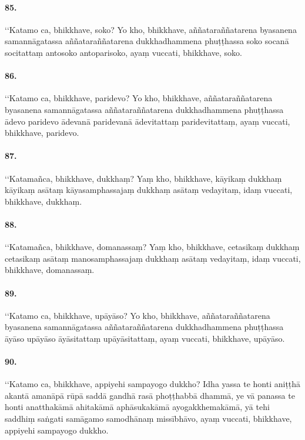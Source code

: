 \paragraph{85.} ‘‘Katamo ca, bhikkhave, soko? Yo kho, bhikkhave, aññataraññatarena byasanena samannāgatassa aññataraññatarena dukkhadhammena phuṭṭhassa soko socanā socitattaṃ antosoko antoparisoko, ayaṃ vuccati, bhikkhave, soko.

\paragraph{86.} ‘‘Katamo ca, bhikkhave, paridevo? Yo kho, bhikkhave, aññataraññatarena byasanena samannāgatassa aññataraññatarena dukkhadhammena phuṭṭhassa ādevo paridevo ādevanā paridevanā ādevitattaṃ paridevitattaṃ, ayaṃ vuccati, bhikkhave, paridevo.

\paragraph{87.} ‘‘Katamañca, bhikkhave, dukkhaṃ? Yaṃ kho, bhikkhave, kāyikaṃ dukkhaṃ kāyikaṃ asātaṃ kāyasamphassajaṃ dukkhaṃ asātaṃ vedayitaṃ, idaṃ vuccati, bhikkhave, dukkhaṃ.

\paragraph{88.} ‘‘Katamañca, bhikkhave, domanassaṃ? Yaṃ kho, bhikkhave, cetasikaṃ dukkhaṃ cetasikaṃ asātaṃ manosamphassajaṃ dukkhaṃ asātaṃ vedayitaṃ, idaṃ vuccati, bhikkhave, domanassaṃ.

\paragraph{89.} ‘‘Katamo ca, bhikkhave, upāyāso? Yo kho, bhikkhave, aññataraññatarena byasanena samannāgatassa aññataraññatarena dukkhadhammena phuṭṭhassa āyāso upāyāso āyāsitattaṃ upāyāsitattaṃ, ayaṃ vuccati, bhikkhave, upāyāso.

\paragraph{90.} ‘‘Katamo ca, bhikkhave, appiyehi sampayogo dukkho? Idha yassa te honti aniṭṭhā akantā amanāpā rūpā saddā gandhā rasā phoṭṭhabbā dhammā, ye vā panassa te honti anatthakāmā ahitakāmā aphāsukakāmā ayogakkhemakāmā, yā tehi saddhiṃ saṅgati samāgamo samodhānaṃ missībhāvo, ayaṃ vuccati, bhikkhave, appiyehi sampayogo dukkho.


